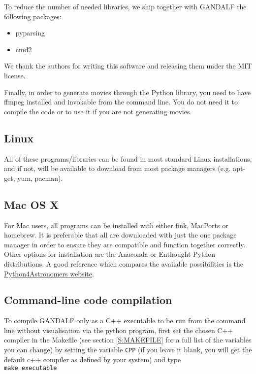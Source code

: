 \documentclass[a4paper]{article}
\newcommand{\var}[1]{\texttt{#1}}
\begin{document}
To reduce the number of needed libraries, we ship together with GANDALF the following packages:
\begin{itemize}
\item pyparsing
\item cmd2
\end{itemize}
We thank the authors for writing this software and releasing them under the MIT license.

Finally, in order to generate movies through the Python library, you need to have ffmpeg installed and invokable from the command line. You do not need it to compile the code or to use it if you are not generating movies.

\subsection{Linux}
All of these programs/libraries can be found in most standard Linux installations, and if not, will be available to download from most package managers (e.g. apt-get, yum, pacman).

\subsection{Mac OS X}
For Mac users, all programs can be installed with either fink, MacPorts or homebrew.  It is preferable that all are downloaded with just the one package manager in order to ensure they are compatible and function together correctly. Other options for installation are the Anaconda or Enthought Python distributions. A good reference which compares the available possibilities is the \href{http://python4astronomers.github.io/installation/recommended_options.html}{Python4Astronomers website}.



\subsection{Command-line code compilation}

To compile GANDALF only as a C++ executable to be run from the command line without visualisation via the python program, first set the chosen C++ compiler in the Makefile (see section \ref{S:MAKEFILE} for a full list of the variables you can change) by setting the variable \var{CPP} (if you leave it blank, you will get the default c++ compiler as defined by your system) and type \\
\newline
\noindent \var{make executable} \\
\end{document}
